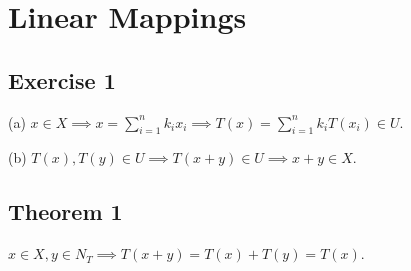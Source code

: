 \section{Linear Mappings}

\subsection{Exercise 1}
(a) $x \in X \implies x = \sum_{i=1}^{n} k_i x_i \implies T(x) = \sum_{i=1}^{n} k_i T(x_i) \in U$.

(b) $T(x), T(y) \in U \implies T(x + y) \in U \implies x + y \in X$.

\subsection*{Theorem 1}
$x \in X, y \in N_T \implies T(x + y) = T(x) + T(y) = T(x)$.
